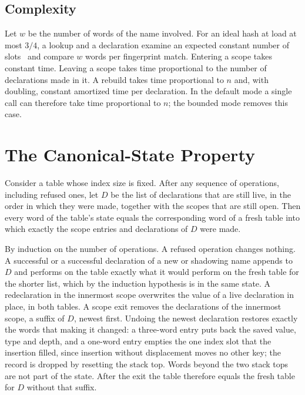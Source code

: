 \subsection{Complexity}
Let $w$ be the number of words of the name involved. For an ideal hash at load at most $3/4$, a lookup and a declaration examine an expected constant number of slots~\cite{knuth3} and compare $w$ words per fingerprint match. Entering a scope takes constant time. Leaving a scope takes time proportional to the number of declarations made in it. A rebuild takes time proportional to $n$ and, with doubling, constant amortized time per declaration. In the default mode a single call can therefore take time proportional to $n$; the bounded mode removes this case.

\section{The Canonical-State Property}
\label{sec:canonical}

\begin{proposition}
\label{prop:canonical}
Consider a table whose index size is fixed. After any sequence of operations, including refused ones, let $D$ be the list of declarations that are still live, in the order in which they were made, together with the scopes that are still open. Then every word of the table's state equals the corresponding word of a fresh table into which exactly the scope entries and declarations of $D$ were made.
\end{proposition}

\begin{IEEEproof}
By induction on the number of operations. A refused operation changes nothing. A successful  or a successful declaration of a new or shadowing name appends to $D$ and performs on the table exactly what it would perform on the fresh table for the shorter list, which by the induction hypothesis is in the same state. A redeclaration in the innermost scope overwrites the value of a live declaration in place, in both tables. A scope exit removes the declarations of the innermost scope, a suffix of $D$, newest first. Undoing the newest declaration restores exactly the words that making it changed: a three-word entry puts back the saved value, type and depth, and a one-word entry empties the one index slot that the insertion filled, since insertion without displacement moves no other key; the record is dropped by resetting the stack top. Words beyond the two stack tops are not part of the state. After the exit the table therefore equals the fresh table for $D$ without that suffix.
\end{IEEEproof}

